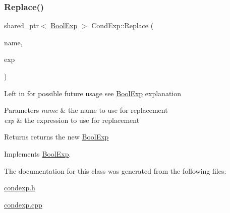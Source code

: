 \mbox{\label{classCondExp_a0bbcb0b6822b47bee1baa09d7c88f4d0}} 
\subsubsection{\texorpdfstring{Replace()}{Replace()}}
{\footnotesize\ttfamily shared\+\_\+ptr$<$ \mbox{\hyperlink{classBoolExp}{Bool\+Exp}} $>$ Cond\+Exp\+::\+Replace (\begin{DoxyParamCaption}\item[{string}]{name,  }\item[{\mbox{\hyperlink{classBoolExp}{Bool\+Exp}} \&}]{exp }\end{DoxyParamCaption})\hspace{0.3cm}{\ttfamily [virtual]}}

Left in for possible future usage see \mbox{\hyperlink{classBoolExp}{Bool\+Exp}} explanation 
\begin{DoxyParams}{Parameters}
{\em name} & the name to use for replacement \\
\hline
{\em exp} & the expression to use for replacement \\
\hline
\end{DoxyParams}
\begin{DoxyReturn}{Returns}
returns the new \mbox{\hyperlink{classBoolExp}{Bool\+Exp}} 
\end{DoxyReturn}


Implements \mbox{\hyperlink{classBoolExp_a6448b7121c238759cc9cc8e48d6f8773}{Bool\+Exp}}.



The documentation for this class was generated from the following files\+:\begin{DoxyCompactItemize}
\item 
\mbox{\hyperlink{condexp_8h}{condexp.\+h}}\item 
\mbox{\hyperlink{condexp_8cpp}{condexp.\+cpp}}\end{DoxyCompactItemize}
